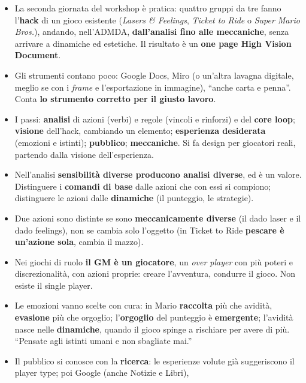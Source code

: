 \begin{itemize}
  \item La seconda giornata del workshop è pratica: quattro gruppi da tre fanno
        l'\textbf{hack} di un gioco esistente (\emph{Lasers \& Feelings},
        \emph{Ticket to Ride} o \emph{Super Mario Bros.}), andando, nell'ADMDA,
        \textbf{dall'analisi fino alle meccaniche}, senza arrivare a dinamiche ed
        estetiche. Il risultato è un \textbf{one page High Vision Document}.
  \item Gli strumenti contano poco: Google Docs, Miro (o un'altra lavagna digitale,
        meglio se con i \emph{frame} e l'esportazione in immagine), ``anche carta e
        penna''. Conta \textbf{lo strumento corretto per il giusto lavoro}.
  \item I passi: \textbf{analisi} di azioni (verbi) e regole (vincoli e rinforzi) e
        del \textbf{core loop}; \textbf{visione} dell'hack, cambiando un elemento;
        \textbf{esperienza desiderata} (emozioni e istinti); \textbf{pubblico};
        \textbf{meccaniche}. Si fa design per giocatori reali, partendo dalla visione
        dell'esperienza.
  \item Nell'analisi \textbf{sensibilità diverse producono analisi diverse}, ed è un
        valore. Distinguere i \textbf{comandi di base} dalle azioni che con essi si
        compiono; distinguere le azioni dalle \textbf{dinamiche} (il punteggio, le
        strategie).
  \item Due azioni sono distinte se sono \textbf{meccanicamente diverse} (il dado
        laser e il dado feelings), non se cambia solo l'oggetto (in Ticket to Ride
        \textbf{pescare è un'azione sola}, cambia il mazzo).
  \item Nei giochi di ruolo \textbf{il GM è un giocatore}, un \emph{over player} con
        più poteri e discrezionalità, con azioni proprie: creare l'avventura,
        condurre il gioco. Non esiste il single player.
  \item Le emozioni vanno scelte con cura: in Mario \textbf{raccolta} più che
        avidità, \textbf{evasione} più che orgoglio; l'\textbf{orgoglio} del
        punteggio è \textbf{emergente}; l'avidità nasce nelle \textbf{dinamiche},
        quando il gioco spinge a rischiare per avere di più. ``Pensate agli istinti
        umani e non sbagliate mai.''
  \item Il pubblico si conosce con la \textbf{ricerca}: le esperienze volute già
        suggeriscono il player type; poi Google (anche Notizie e Libri),

\end{itemize}
